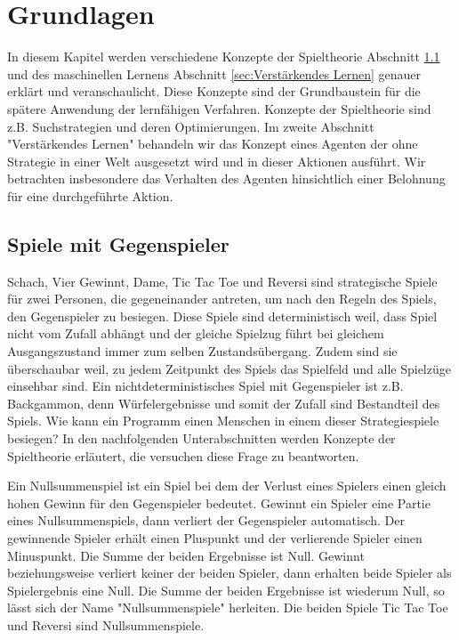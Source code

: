 \chapter{Grundlagen}
\label{cha:Grundlagen}

In diesem Kapitel werden verschiedene Konzepte der Spieltheorie Abschnitt \ref{sec:Spiele mit Gegner} und des maschinellen Lernens Abschnitt \ref{sec:Verstärkendes Lernen} genauer erklärt und veranschaulicht. Diese Konzepte sind der Grundbaustein für die spätere Anwendung der lernfähigen Verfahren. Konzepte der Spieltheorie sind z.B. Suchstrategien und deren Optimierungen. Im zweite Abschnitt "Verstärkendes Lernen" behandeln wir das Konzept eines Agenten der ohne Strategie in einer Welt ausgesetzt wird und in dieser Aktionen ausführt. Wir betrachten insbesondere das Verhalten des Agenten hinsichtlich einer Belohnung für eine durchgeführte Aktion. 

\section{Spiele mit Gegenspieler}
\label{sec:Spiele mit Gegner}
Schach, Vier Gewinnt, Dame, Tic Tac Toe und Reversi sind strategische Spiele für zwei Personen, die gegeneinander antreten, um nach den Regeln des Spiels, den Gegenspieler zu besiegen. Diese Spiele sind deterministisch weil, dass Spiel nicht vom Zufall abhängt und der gleiche Spielzug führt bei gleichem Ausgangszustand immer zum selben Zustandsübergang. Zudem sind sie überschaubar weil, zu jedem Zeitpunkt des Spiels das Spielfeld und alle Spielzüge einsehbar sind. Ein nichtdeterministisches Spiel mit Gegenspieler ist z.B. Backgammon, denn Würfelergebnisse und somit der Zufall sind Bestandteil des Spiels. Wie kann ein Programm einen Menschen in einem dieser Strategiespiele besiegen? In den nachfolgenden Unterabschnitten werden Konzepte der Spieltheorie erläutert, die versuchen diese Frage zu beantworten.

Ein Nullsummenspiel ist ein Spiel bei dem der Verlust eines Spielers einen gleich hohen Gewinn für den Gegenspieler bedeutet. Gewinnt ein Spieler eine Partie eines Nullsummenspiels, dann verliert der Gegenspieler automatisch. Der gewinnende Spieler erhält einen Pluspunkt und der verlierende Spieler einen Minuspunkt. Die Summe der beiden Ergebnisse ist Null. Gewinnt beziehungsweise verliert keiner der beiden Spieler, dann erhalten beide Spieler als Spielergebnis eine Null. Die Summe der beiden Ergebnisse ist wiederum Null, so lässt sich der Name "Nullsummenspiele" herleiten. Die beiden Spiele Tic Tac Toe und Reversi sind Nullsummenspiele. 

